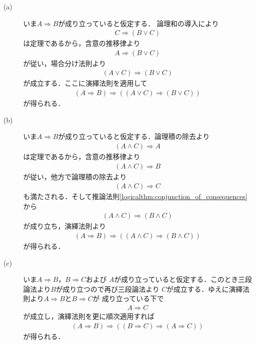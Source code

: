 	\begin{prf}\mbox{}
		\begin{description}
			\item[(a)]
				いま$A \Longrightarrow B$が成り立っていると仮定する．
				論理和の導入により
				\begin{align}
					C \Longrightarrow (B \vee C)
				\end{align}
				は定理であるから，含意の推移律より
				\begin{align}
					A \Longrightarrow (B \vee C)
				\end{align}
				が従い，場合分け法則より
				\begin{align}
					(A \vee C) \Longrightarrow (B \vee C)
				\end{align}
				が成立する．ここに演繹法則を適用して
				\begin{align}
					(A \Longrightarrow B) \Longrightarrow 
					( (A \vee C) \Longrightarrow (B \vee C) )
				\end{align}
				が得られる．
				
			\item[(b)]
				いま$A \Longrightarrow B$が成り立っていると仮定する．論理積の除去より
				\begin{align}
					(A \wedge C) \Longrightarrow A
				\end{align}
				は定理であるから，含意の推移律より
				\begin{align}
					(A \wedge C) \Longrightarrow B
				\end{align}
				が従い，他方で論理積の除去より
				\begin{align}
					(A \wedge C) \Longrightarrow C
				\end{align}
				も満たされる．そして推論法則\ref{logicalthm:conjunction_of_consequences}から
				\begin{align}
					(A \wedge C) \Longrightarrow (B \wedge C)
				\end{align}
				が成り立ち，演繹法則より
				\begin{align}
					(A \Longrightarrow B) \Longrightarrow ((A \wedge C) \Longrightarrow (B \wedge C))
				\end{align}
				が得られる．
				
			\item[(c)]
				いま$A \Longrightarrow B$，$B \Longrightarrow C$および
				$A$が成り立っていると仮定する．このとき三段論法より$B$が成り立つので再び三段論法より
				$C$が成立する．ゆえに演繹法則より$A \Longrightarrow B$と$B \Longrightarrow C$が
				成り立っている下で
				\begin{align}
					A \Longrightarrow C
				\end{align}
				が成立し，演繹法則を更に順次適用すれば
				\begin{align}
					(A \Longrightarrow B) \Longrightarrow ( (B \Longrightarrow C) \Longrightarrow (A \Longrightarrow C) )
				\end{align}
				が得られる．
				

\end{description}
\end{prf}
